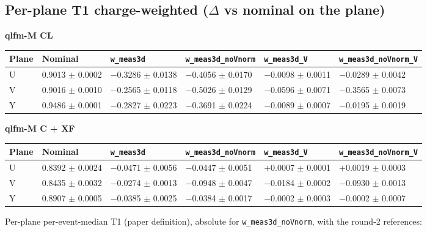 \documentclass[10pt,a4paper]{article}
\begin{document}
\subsection{Per-plane T1 charge-weighted ($\Delta$ vs nominal on the plane)}
\textbf{qlfm-M CL}

\begin{center}\footnotesize
\setlength{\tabcolsep}{3pt}\renewcommand{\arraystretch}{1.15}
\begin{tabularx}{\linewidth}{LLLLLL}
\toprule
\textbf{Plane} & \textbf{Nominal} & \textbf{\texttt{w\_\allowbreak{}meas3d}} & \textbf{\texttt{w\_\allowbreak{}meas3d\_\allowbreak{}noVnorm}} & \textbf{\texttt{w\_\allowbreak{}meas3d\_\allowbreak{}V}} & \textbf{\texttt{w\_\allowbreak{}meas3d\_\allowbreak{}noVnorm\_\allowbreak{}V}} \\
\midrule
U & 0.9013 $\pm$ 0.0002 & $-$0.3286 $\pm$ 0.0138 & $-$0.4056 $\pm$ 0.0170 & $-$0.0098 $\pm$ 0.0011 & $-$0.0289 $\pm$ 0.0042 \\
V & 0.9016 $\pm$ 0.0010 & $-$0.2565 $\pm$ 0.0118 & $-$0.5026 $\pm$ 0.0129 & $-$0.0596 $\pm$ 0.0071 & $-$0.3565 $\pm$ 0.0073 \\
Y & 0.9486 $\pm$ 0.0001 & $-$0.2827 $\pm$ 0.0223 & $-$0.3691 $\pm$ 0.0224 & $-$0.0089 $\pm$ 0.0007 & $-$0.0195 $\pm$ 0.0019 \\
\bottomrule
\end{tabularx}
\end{center}
\textbf{qlfm-M C + XF}

\begin{center}\footnotesize
\setlength{\tabcolsep}{3pt}\renewcommand{\arraystretch}{1.15}
\begin{tabularx}{\linewidth}{LLLLLL}
\toprule
\textbf{Plane} & \textbf{Nominal} & \textbf{\texttt{w\_\allowbreak{}meas3d}} & \textbf{\texttt{w\_\allowbreak{}meas3d\_\allowbreak{}noVnorm}} & \textbf{\texttt{w\_\allowbreak{}meas3d\_\allowbreak{}V}} & \textbf{\texttt{w\_\allowbreak{}meas3d\_\allowbreak{}noVnorm\_\allowbreak{}V}} \\
\midrule
U & 0.8392 $\pm$ 0.0024 & $-$0.0471 $\pm$ 0.0056 & $-$0.0447 $\pm$ 0.0051 & +0.0007 $\pm$ 0.0001 & +0.0019 $\pm$ 0.0003 \\
V & 0.8435 $\pm$ 0.0032 & $-$0.0274 $\pm$ 0.0013 & $-$0.0948 $\pm$ 0.0047 & $-$0.0184 $\pm$ 0.0002 & $-$0.0930 $\pm$ 0.0013 \\
Y & 0.8907 $\pm$ 0.0005 & $-$0.0385 $\pm$ 0.0025 & $-$0.0384 $\pm$ 0.0017 & $-$0.0002 $\pm$ 0.0003 & $-$0.0002 $\pm$ 0.0007 \\
\bottomrule
\end{tabularx}
\end{center}
Per-plane per-event-median T1 (paper definition), absolute for \texttt{w\_\allowbreak{}meas3d\_\allowbreak{}noVnorm}, with the round-2 references:
\end{document}
